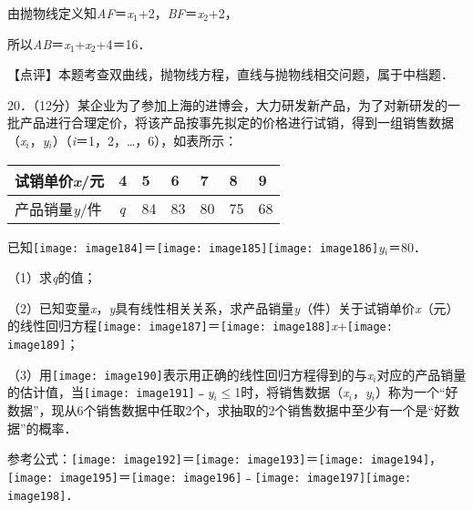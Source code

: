 \documentclass[a4paper,11pt,UTF8,twoside]{ctexart} %
\begin{document}
由抛物线定义知\textit{AF}＝\textit{x}${}_{1}$+2，\textit{BF}＝\textit{x}${}_{2}$+2，

所以{\textbar}\textit{AB}{\textbar}＝\textit{x}${}_{1}$+\textit{x}${}_{2}$+4＝16．

【点评】本题考查双曲线，抛物线方程，直线与抛物线相交问题，属于中档题．

20．（12分）某企业为了参加上海的进博会，大力研发新产品，为了对新研发的一批产品进行合理定价，将该产品按事先拟定的价格进行试销，得到一组销售数据（\textit{x${}_{i}$}，\textit{y${}_{i}$}）（\textit{i}＝1，2，{\dots}，6），如表所示：

\begin{tabular}{|p{0.9in}|p{0.2in}|p{0.3in}|p{0.3in}|p{0.3in}|p{0.3in}|p{0.3in}|} \hline 
试销单价\textit{x}/元 & 4 & 5 & 6 & 7 & 8 & 9 \\ \hline 
产品销量\textit{y}/件 & \textit{q} & 84 & 83 & 80 & 75 & 68 \\ \hline 
\end{tabular}

已知\texttt{[image: image184]}＝\texttt{[image: image185]}\texttt{[image: image186]}\textit{y${}_{i}$}＝80．

（1）求\textit{q}的值；

（2）已知变量\textit{x}，\textit{y}具有线性相关关系，求产品销量\textit{y}（件）关于试销单价\textit{x}（元）的线性回归方程\texttt{[image: image187]}＝\texttt{[image: image188]}\textit{x}+\texttt{[image: image189]}；

（3）用\texttt{[image: image190]}表示用正确的线性回归方程得到的与\textit{x${}_{i}$}对应的产品销量的估计值，当{\textbar}\texttt{[image: image191]}﹣\textit{y${}_{i}$}{\textbar}$\mathrm{\le}$1时，将销售数据（\textit{x${}_{i}$}，\textit{y${}_{i}$}）称为一个``好数据''，现从6个销售数据中任取2个，求抽取的2个销售数据中至少有一个是``好数据''的概率．

参考公式：\texttt{[image: image192]}＝\texttt{[image: image193]}＝\texttt{[image: image194]}，\texttt{[image: image195]}＝\texttt{[image: image196]}﹣\texttt{[image: image197]}\texttt{[image: image198]}．
\end{document}
